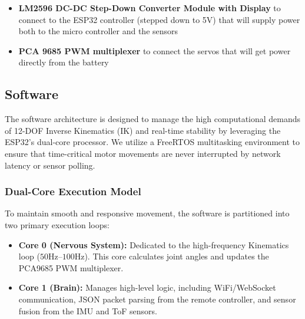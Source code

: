\documentclass{article}
\begin{document}
\begin{itemize}

  \item{\textbf{LM2596 DC-DC Step-Down Converter Module with Display} to connect to the ESP32 controller (stepped down to 5V) that will supply power both to the micro controller and the sensors}

  \item{\textbf{PCA 9685 PWM multiplexer} to connect the servos that will get power directly from the battery}
\end{itemize}


\subsection{Software}
The software architecture is designed to manage the high computational demands of 12-DOF Inverse Kinematics (IK) and real-time stability by leveraging the ESP32’s dual-core processor. We utilize a FreeRTOS multitasking environment to ensure that time-critical motor movements are never interrupted by network latency or sensor polling.

\subsubsection{Dual-Core Execution Model}
To maintain smooth and responsive movement, the software is partitioned into two primary execution loops:
\begin{itemize}
  \item \textbf{Core 0 (Nervous System):} Dedicated to the high-frequency Kinematics loop ($50\text{Hz}$--$100\text{Hz}$). This core calculates joint angles and updates the PCA9685 PWM multiplexer.
  \item \textbf{Core 1 (Brain):} Manages high-level logic, including WiFi/WebSocket communication, JSON packet parsing from the remote controller, and sensor fusion from the IMU and ToF sensors.
\end{itemize}
\end{document}
